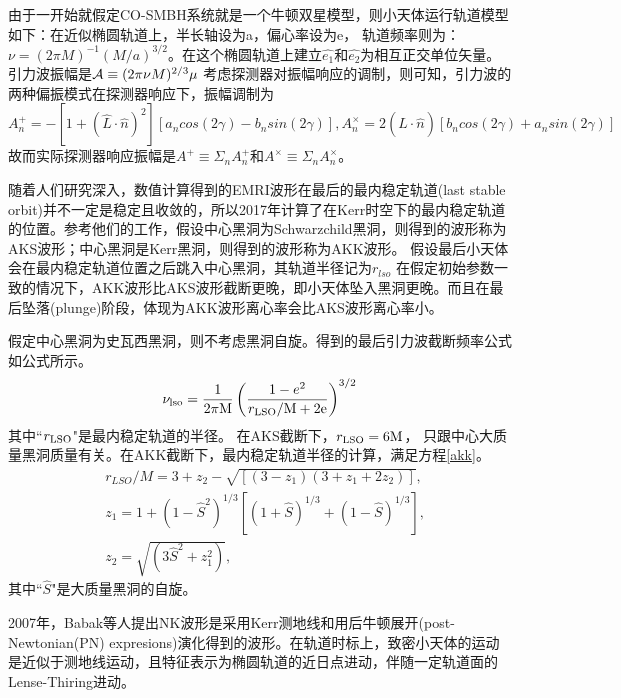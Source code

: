 由于一开始就假定CO-SMBH系统就是一个牛顿双星模型，则小天体运行轨道模型如下：在近似椭圆轨道上，半长轴设为a，偏心率设为e， 轨道频率则为：$\nu = (2\pi M)^{-1}(M/a)^{3/2}$。在这个椭圆轨道上建立$\hat{e_1}$和$\hat{e_2}$为相互正交单位矢量。引力波振幅是${\cal{A}} \equiv{ (2 \pi \nu M)^{2/3} \mu}$
考虑探测器对振幅响应的调制，则可知，引力波的两种偏振模式在探测器响应下，振幅调制为$A_n^{+}=-[1+(\hat{L} \cdot \hat{n})^2][a_n cos(2\gamma) - b_n sin(2\gamma)],A_n^{\times} = 2(\hat{L} \cdot {\hat{n}})[b_n cos(2 \gamma) + a_n sin(2\gamma)]$
故而实际探测器响应振幅是$A^+ \equiv \Sigma_n A_n^+$和$A^{\times} \equiv \Sigma_n A_n^{\times}$。



随着人们研究深入，数值计算得到的EMRI波形在最后的最内稳定轨道(last stable orbit)并不一定是稳定且收敛的，所以2017年计算了在Kerr时空下的最内稳定轨道的位置。参考他们的工作，假设中心黑洞为Schwarzchild黑洞，则得到的波形称为AKS波形；中心黑洞是Kerr黑洞，则得到的波形称为AKK波形。
假设最后小天体会在最内稳定轨道位置之后跳入中心黑洞，其轨道半径记为$r_{lso}$
在假定初始参数一致的情况下，AKK波形比AKS波形截断更晚，即小天体坠入黑洞更晚。而且在最后坠落(plunge)阶段，体现为AKK波形离心率会比AKS波形离心率小。

假定中心黑洞为史瓦西黑洞，则不考虑黑洞自旋。得到的最后引力波截断频率公式如公式所示\cite{cutler1994gravitational}。
\begin{equation}
\nu_{\rm lso}= \frac{1}{2\pi \rm M } \left(  \frac{ 1-e^2}{r_{\rm LSO}/\rm M +2e }\right)^{3/2}
\end{equation}
其中``$r_{\rm LSO}$"是最内稳定轨道的半径。
在AKS截断下，$r_{\rm LSO}=6\rm M$， 只跟中心大质量黑洞质量有关。在AKK截断下，最内稳定轨道半径的计算，满足方程\ref{akk}。
\begin{align}\label{akk}
&r_{LSO}/M=3+z_2-\sqrt{[(3-z_1)(3+z_1+2z_2)]}, \nonumber\\
&z_1=1+(1-\hat{S}^2)^{1/3}[(1+\hat{S})^{1/3}+(1-\hat{S})^{1/3}],\nonumber\\
&z_2= \sqrt{(3\hat{S}^2+z_1^2)},
\end{align}
其中``$\hat{S}$"是大质量黑洞的自旋。

2007年，Babak等人提出NK波形是采用Kerr测地线和用后牛顿展开(post-Newtonian(PN) expresions)演化得到的波形。在轨道时标上，致密小天体的运动是近似于测地线运动，且特征表示为椭圆轨道的近日点进动，伴随一定轨道面的Lense-Thiring进动。

